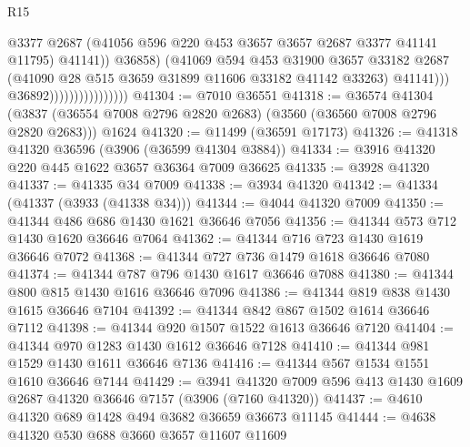 \begin{lexlean}{R15}
\begin{coremodule}
                                              @3377
                                              @2687
                                              (@41056
                                                @596
                                                @220
                                                @453
                                                @3657
                                                @3657
                                                @2687
                                                @3377
                                                @41141
                                                @11795)
                                              @41141))
                                          @36858)
                                        (@41069
                                          @594
                                          @453
                                          @31900
                                          @3657
                                          @33182
                                          @2687
                                          (@41090 @28 @515 @3659 @31899 @11606 @33182 @41142 @33263)
                                          @41141)))
                                    @36892))))))))))))))))
@41304 := @7010 @36551
@41318 := @36574
    @41304
    (@3837 (@36554 @7008 @2796 @2820 @2683) (@3560 (@36560 @7008 @2796 @2820 @2683)))
    @1624
@41320 := @11499 (@36591 @17173)
@41326 := @41318 @41320 @36596 (@3906 (@36599 @41304 @3884))
@41334 := @3916 @41320 @220 @445 @1622 @3657 @36364 @7009 @36625
@41335 := @3928 @41320
@41337 := @41335 @34 @7009
@41338 := @3934 @41320
@41342 := @41334 (@41337 (@3933 (@41338 @34)))
@41344 := @4044 @41320 @7009
@41350 := @41344 @486 @686 @1430 @1621 @36646 @7056
@41356 := @41344 @573 @712 @1430 @1620 @36646 @7064
@41362 := @41344 @716 @723 @1430 @1619 @36646 @7072
@41368 := @41344 @727 @736 @1479 @1618 @36646 @7080
@41374 := @41344 @787 @796 @1430 @1617 @36646 @7088
@41380 := @41344 @800 @815 @1430 @1616 @36646 @7096
@41386 := @41344 @819 @838 @1430 @1615 @36646 @7104
@41392 := @41344 @842 @867 @1502 @1614 @36646 @7112
@41398 := @41344 @920 @1507 @1522 @1613 @36646 @7120
@41404 := @41344 @970 @1283 @1430 @1612 @36646 @7128
@41410 := @41344 @981 @1529 @1430 @1611 @36646 @7136
@41416 := @41344 @567 @1534 @1551 @1610 @36646 @7144
@41429 := @3941 @41320 @7009 @596 @413 @1430 @1609 @2687 @41320 @36646 @7157 (@3906 (@7160 @41320))
@41437 := @4610 @41320 @689 @1428 @494 @3682 @36659 @36673 @11145
@41444 := @4638 @41320 @530 @688 @3660 @3657 @11607 @11609

\end{coremodule}
\end{lexlean}
